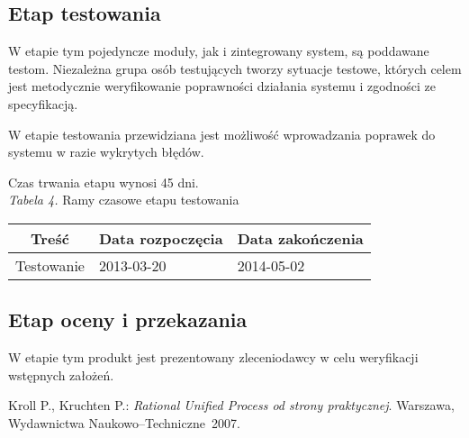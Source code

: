 \documentclass 	[11pt, a4paper, leqno]	{article}					%
\begin{document}
\subsection{Etap testowania}
\noindent
W etapie tym pojedyncze moduły, jak i zintegrowany system, są poddawane testom. Niezależna grupa osób testujących tworzy sytuacje testowe, których celem jest metodycznie weryfikowanie poprawności działania systemu i zgodności ze specyfikacją.

W etapie testowania przewidziana jest możliwość wprowadzania poprawek do systemu w razie wykrytych błędów. 

Czas trwania etapu wynosi 45 dni. \\

\textit{Tabela 4.} Ramy czasowe etapu testowania

\begin{center}
	\begin{tabular}{| l | l | l |}
		\hline
		\multicolumn{1}{|c|}{Treść} & 
		\multicolumn{1}{|c|}{Data rozpoczęcia} & 
		\multicolumn{1}{|c|}{Data zakończenia} \\ \hline \hline
		Testowanie & 2013-03-20 & 2014-05-02 \\ \hline
	\end{tabular}
\end{center}

\subsection{Etap oceny i przekazania}
\noindent
W etapie tym produkt jest prezentowany zleceniodawcy w celu weryfikacji wstępnych założeń. 

\newpage

\begin{thebibliography}{2}
	 Kroll P., Kruchten P.: \emph{Rational Unified Process od strony praktycznej}. Warszawa, Wydawnictwa Naukowo--Techniczne~2007.
\end{thebibliography}
\end{document}
